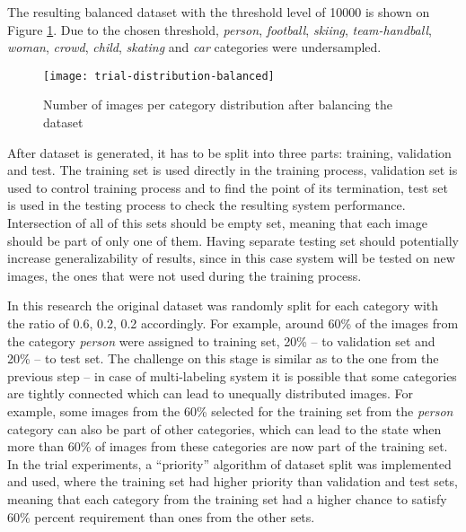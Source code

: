     The resulting balanced dataset with the threshold level of 10000 is shown on Figure \ref{fig:trial-distribution-balanced}. Due to the chosen threshold, \textit{person}, \textit{football}, \textit{skiing}, \textit{team-handball}, \textit{woman}, \textit{crowd}, \textit{child}, \textit{skating} and \textit{car} categories were undersampled.
    
    \begin{figure}[h!]
    \centering
    \texttt{[image: trial-distribution-balanced]}
    \caption{Number of images per category distribution after balancing the dataset}
    \label{fig:trial-distribution-balanced}
    \end{figure}
    
    
    After dataset is generated, it has to be split into three parts: training, validation and test. The training set is used directly in the training process, validation set is used to control training process and to find the point of its termination, test set is used in the testing process to check the resulting system performance. Intersection of all of this sets should be empty set, meaning that each image should be part of only one of them. Having separate testing set should potentially increase generalizability of results, since in this case system will be tested on new images, the ones that were not used during the training process. 
    
    In this research the original dataset was randomly split for each category with the ratio of 0.6, 0.2, 0.2 accordingly. For example, around 60\% of the images from the category \textit{person} were assigned to training set, 20\% -- to validation set and 20\% -- to test set. The challenge on this stage is similar as to the one from the previous step -- in case of multi-labeling system it is possible that some categories are tightly connected which can lead to unequally distributed images. For example, some images from the 60\% selected for the training set from the \textit{person} category can also be part of other categories, which can lead to the state when more than 60\% of images from these categories are now part of the training set. In the trial experiments, a ``priority'' algorithm of dataset split was implemented and used, where the training set had higher priority than validation and test sets, meaning that each category from the training set had a higher chance to satisfy 60\% percent requirement than ones from the other sets.
    
